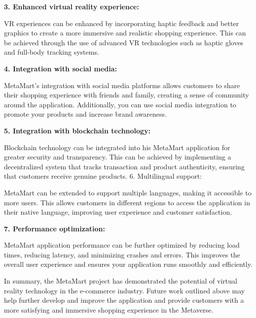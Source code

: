 \textbf{3. Enhanced virtual reality experience:}

VR experiences can be enhanced by incorporating haptic feedback and better graphics to create a more immersive and realistic shopping experience. This can be achieved through the use of advanced VR technologies such as haptic gloves and full-body tracking systems.

\textbf{4. Integration with social media:}

MetaMart's integration with social media platforms allows customers to share their shopping experience with friends and family, creating a sense of community around the application. Additionally, you can use social media integration to promote your products and increase brand awareness.

\textbf{5. Integration with blockchain technology:}

Blockchain technology can be integrated into his MetaMart application for greater security and transparency. This can be achieved by implementing a decentralized system that tracks transaction and product authenticity, ensuring that customers receive genuine products. 6. Multilingual support:

MetaMart can be extended to support multiple languages, making it accessible to more users. This allows customers in different regions to access the application in their native language, improving user experience and customer satisfaction.

\textbf{7. Performance optimization:}

MetaMart application performance can be further optimized by reducing load times, reducing latency, and minimizing crashes and errors. This improves the overall user experience and ensures your application runs smoothly and efficiently.

In summary, the MetaMart project has demonstrated the potential of virtual reality technology in the e-commerce industry. Future work outlined above may help further develop and improve the application and provide customers with a more satisfying and immersive shopping experience in the Metaverse. 